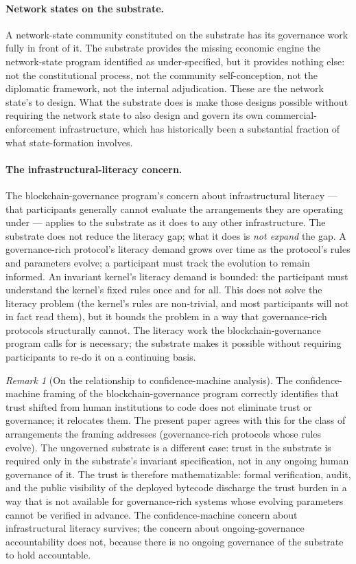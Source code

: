 \documentclass[11pt,a4paper]{article}
\theoremstyle{remark}
\newtheorem{remark}{Remark}[section]
\begin{document}
\paragraph{Network states on the substrate.}
A network-state community constituted on the substrate has its
governance work fully in front of it. The substrate provides
the missing economic engine the network-state program identified
as under-specified, but it provides nothing else: not the
constitutional process, not the community self-conception, not
the diplomatic framework, not the internal adjudication. These
are the network state's to design. What the substrate does is
make those designs possible without requiring the network state
to also design and govern its own commercial-enforcement
infrastructure, which has historically been a substantial
fraction of what state-formation involves.

\paragraph{The infrastructural-literacy concern.}
The blockchain-governance program's concern about
infrastructural literacy --- that participants generally cannot
evaluate the arrangements they are operating under --- applies
to the substrate as it does to any other infrastructure. The
substrate does not reduce the literacy gap; what it does is
\emph{not expand} the gap. A governance-rich protocol's literacy
demand grows over time as the protocol's rules and parameters
evolve; a participant must track the evolution to remain
informed. An invariant kernel's literacy demand is bounded: the
participant must understand the kernel's fixed rules once and
for all. This does not solve the literacy problem (the kernel's
rules are non-trivial, and most participants will not in fact
read them), but it bounds the problem in a way that
governance-rich protocols structurally cannot. The literacy work
the blockchain-governance program calls for is necessary; the
substrate makes it possible without requiring participants to
re-do it on a continuing basis.

\begin{remark}[On the relationship to confidence-machine analysis]
The confidence-machine framing of the
blockchain-governance program correctly identifies that trust
shifted from human institutions to code does not eliminate
trust or governance; it relocates them. The present paper
agrees with this for the class of arrangements the framing
addresses (governance-rich protocols whose rules evolve). The
ungoverned substrate is a different case: trust in the
substrate is required only in the substrate's invariant
specification, not in any ongoing human governance of it. The
trust is therefore mathematizable: formal verification, audit,
and the public visibility of the deployed bytecode discharge
the trust burden in a way that is not available for
governance-rich systems whose evolving parameters cannot be
verified in advance. The confidence-machine concern about
infrastructural literacy survives; the concern about
ongoing-governance accountability does not, because there is no
ongoing governance of the substrate to hold accountable.
\end{remark}
\end{document}

